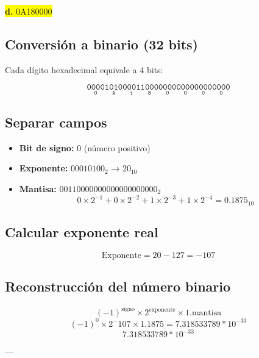 \documentclass[a4paper,12pt]{article}
\begin{document}
	\begin{center}
		\colorbox{yellow}{\textbf{d.} 0A180000}
		\subsection*{Conversión a binario (32 bits)}
		Cada dígito hexadecimal equivale a 4 bits:
		
		\[
		\mathtt{
			\underset{\text{0}}{\boxed{\mathtt{0000}}}
			\underset{\text{A}}{\boxed{\mathtt{1010}}}
			\underset{\text{1}}{\boxed{\mathtt{0001}}}
			\underset{\text{8}}{\boxed{\mathtt{1000}}}
			\underset{\text{0}}{\boxed{\mathtt{0000}}}
			\underset{\text{0}}{\boxed{\mathtt{0000}}}
			\underset{\text{0}}{\boxed{\mathtt{0000}}}
			\underset{\text{0}}{\boxed{\mathtt{0000}}}
		}	
		\]
		
		\subsection*{Separar campos}
		
		\begin{itemize}
			\item \textbf{Bit de signo:} 0 (número positivo)
			\item \textbf{Exponente:} $00010100_2$ → $20_{10}$
			\item \textbf{Mantisa:} $00110000000000000000000_2$ 
			\[
			0\times2^{-1} + 0\times2^{-2} + 1\times2^{-3} + 1\times2^{-4} = 0.1875_{10}
			\]
		\end{itemize}
		
		\subsection*{Calcular exponente real}
		
		\[
		\text{Exponente} = 20 - 127 = -107
		\]
		
		
		
		\subsection*{Reconstrucción del número binario}	
		\[
		(-1)^{\text{signo}} \times 2^{\text{exponente}} \times 1.\text{mantisa}
		\]
		\[
		(-1)^0 \times 2^-107 \times 1.1875 = 7.318533789*10^{-33}
		\]
		\vspace{1em}
		\[
		\boxed{7.318533789*10^{-33}}
		\]
		
		---
	\end{center}
\end{document}
